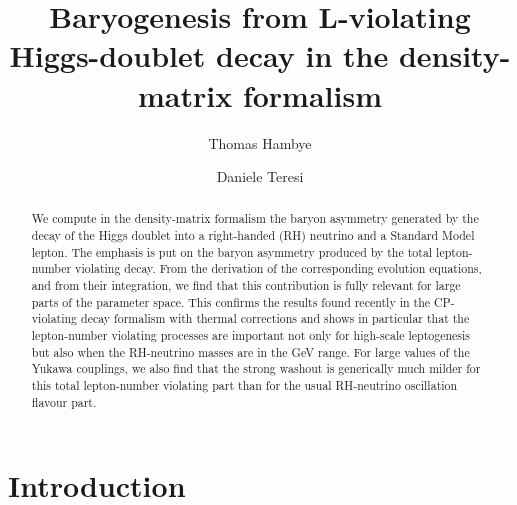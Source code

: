 \documentclass[prd,twocolumn,superscriptaddress,preprintnumbers,nofootinbib,
noshowpacs,groupedaddress]{revtex4-1} %
\begin{document}
\title{Baryogenesis from L-violating Higgs-doublet decay in the density-matrix formalism}

\author{Thomas Hambye}
\author{Daniele Teresi}





\begin{abstract}
We compute in the density-matrix formalism the baryon asymmetry generated by the decay of the Higgs doublet into a right-handed (RH) neutrino and a Standard Model lepton. The emphasis is put on the baryon asymmetry produced by the total lepton-number violating decay. From the derivation of the corresponding evolution equations, and from their integration, we find that this contribution is fully relevant for large parts of the parameter space. 
This confirms the results found recently in the CP-violating decay formalism with thermal corrections and shows in particular that the lepton-number violating processes are important not only for high-scale leptogenesis but also when the RH-neutrino masses are in the GeV range. For large values of the Yukawa couplings, we also find that the strong washout is generically much milder for this total lepton-number violating part than for the usual RH-neutrino oscillation flavour part. 
\end{abstract}

\maketitle

\section{Introduction}
\end{document}
